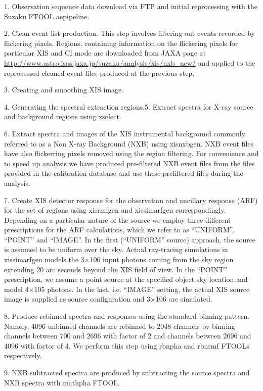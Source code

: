 \documentclass[letterpaper,10pt,english]{sphinxmanual}
\begin{document}
1. Observation sequence data download via FTP and initial reprocessing with the Suzaku FTOOL aepipeline.

2. Clean event list production. This step involves filtering out events recorded by flickering pixels. Regions, containing information on the flickering pixels for particular XIS and CI mode are downloaded from JAXA page at \url{http://www.astro.isas.jaxa.jp/suzaku/analysis/xis/nxb\_new/} and applied to the reprocessed cleaned event files produced at the previous step. 

3. Creating and smoothing  XIS image.

4. Generating the spectral extraction regions.5. Extract spectra for X-ray source and background regions using xselect.

6. Extract spectra and images of the XIS instrumental background commonly referred to as a Non X-ray Background (NXB) using xisnxbgen. NXB event files have also flickerring pixels removed using the region filtering. For convenience and to speed up analysis we have produced pre-filtered NXB event files from the files provided in the calibration database and use these prefiltered files during the analysis.

7. Create XIS detector response for the observation and ancillary response (ARF) for the set of regions using xisrmfgen and xissimarfgen correspondingly. Depending on a particular nature of the source we employ three different prescriptions for the ARF calculations, which we refer to as ``UNIFORM'', ``POINT'' and ``IMAGE''. In the first (``UNIFORM'' source) approach, the source is assumed to be uniform over the sky. Actual ray-tracing simulations in xissimarfgen models the 3×106 input photons coming from the sky region extending 20 arc seconds beyond the XIS field of view. In the ``POINT'' prescription, we assume a point source at the specified object sky location and model 4×105 photons. In the last, i.e. ``IMAGE'' setting, the actual XIS source image is supplied as source configuration and 3×106 are simulated.

8. Produce rebinned spectra and responses using the standard binning pattern. Namely, 4096 unbinned channels are rebinned to 2048 channels by binning channels between 700 and 2696 with factor of 2 and channels between 2696 and 4096 with factor of 4. We perform this step using rbnpha and rbnrmf FTOOLs respectively.

9. NXB subtracted spectra are produced by subtracting the source spectra and NXB spectra with mathpha FTOOL.
\end{document}
